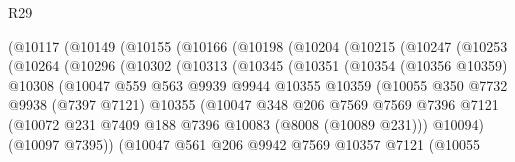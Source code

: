 \begin{lexlean}{R29}
\begin{coremodule}
          (@10117
            (@10149
              (@10155
                (@10166
                  (@10198
                    (@10204
                      (@10215
                        (@10247
                          (@10253
                            (@10264
                              (@10296
                                (@10302
                                  (@10313
                                    (@10345
                                      (@10351
                                        (@10354
                                          (@10356 @10359)
                                          @10308
                                          (@10047
                                            @559
                                            @563
                                            @9939
                                            @9944
                                            @10355
                                            @10359
                                            (@10055
                                              @350
                                              @7732
                                              @9938
                                              (@7397 @7121)
                                              @10355
                                              (@10047
                                                @348
                                                @206
                                                @7569
                                                @7569
                                                @7396
                                                @7121
                                                (@10072
                                                  @231
                                                  @7409
                                                  @188
                                                  @7396
                                                  @10083
                                                  (@8008 (@10089 @231)))
                                                @10094)
                                              (@10097 @7395))
                                            (@10047
                                              @561
                                              @206
                                              @9942
                                              @7569
                                              @10357
                                              @7121
                                              (@10055

\end{coremodule}
\end{lexlean}
